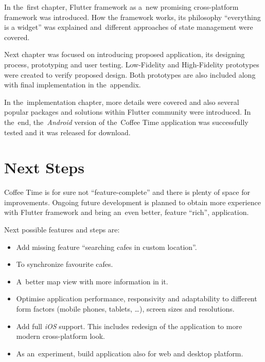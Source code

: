 \begin{conclusion}
In the~first chapter, Flutter framework as a~new promising cross-platform framework was introduced. How the framework works, its philosophy ``everything is a widget'' was explained and~different approaches of state management were covered. 

Next chapter was focused on introducing proposed application, its designing process, prototyping and user testing. Low-Fidelity and High-Fidelity prototypes were created to verify proposed design. Both prototypes are also included along with final implementation in the~appendix. 

In the~implementation chapter, more details were covered and also several popular packages and solutions within Flutter community were introduced. In the~end, the~\textit{Android} version of the~Coffee Time application was successfully tested and it was released for download. 

\section{Next Steps}
Coffee Time is for sure not ``feature-complete'' and there is plenty of space for improvements. Ongoing future development is planned to obtain more experience with Flutter framework and bring an~even better, feature ``rich'', application.

Next possible features and steps are:

\begin{itemize}
    \item Add missing feature ``searching cafes in custom location''.
    \item To synchronize favourite cafes.
    \item A~better map view with more information in it.
    \item Optimise application performance, responsivity and adaptability to different form factors (mobile phones, tablets, \ldots), screen sizes and resolutions.
    \item Add full \textit{iOS} support. This includes redesign of the application to more modern cross-platform look. 
    \item As an~experiment, build application also for web and desktop platform.
\end{itemize}


\end{conclusion}
